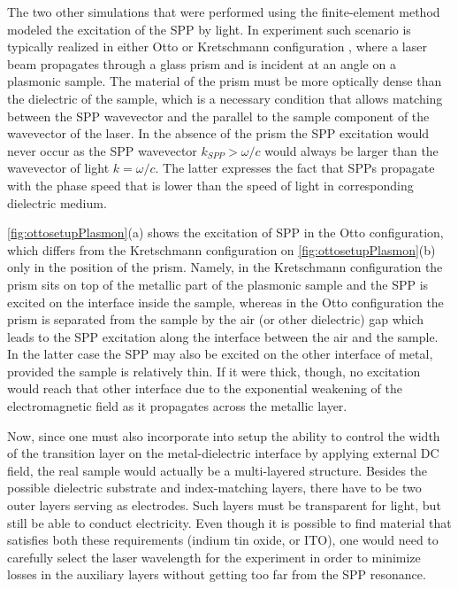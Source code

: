 The two other simulations that were performed using the finite-element method modeled the excitation of the SPP by light.
In experiment such scenario is typically realized in either Otto or Kretschmann configuration \cite{raether}, where a laser beam propagates through a glass prism and is incident at an angle on a plasmonic sample.
The material of the prism must be more optically dense than the dielectric of the sample, which is a necessary condition that allows matching between the SPP wavevector and the parallel to the sample component of the wavevector of the laser.
In the absence of the prism the SPP excitation would never occur as the SPP wavevector $k_{SPP} > \omega/c$ would always be larger than the wavevector of light $k = \omega/c$.
The latter expresses the fact that SPPs propagate with the phase speed that is lower than the speed of light in corresponding dielectric medium.

\cref{fig:ottosetupPlasmon}(a) shows the excitation of SPP in the Otto configuration, which differs from the Kretschmann configuration on \cref{fig:ottosetupPlasmon}(b) only in the position of the prism.
Namely, in the Kretschmann configuration the prism sits on top of the metallic part of the plasmonic sample and the SPP is excited on the interface inside the sample, whereas in the Otto configuration the prism is separated from the sample by the air (or other dielectric) gap which leads to the SPP excitation along the interface between the air and the sample.
In the latter case the SPP may also be excited on the other interface of metal, provided the sample is relatively thin.
If it were thick, though, no excitation would reach that other interface due to the exponential weakening of the electromagnetic field as it propagates across the metallic layer.

Now, since one must also incorporate into setup the ability to control the width of the transition layer on the metal-dielectric interface by applying external DC field, the real sample would actually be a multi-layered structure.
Besides the possible dielectric substrate and index-matching layers, there have to be two outer layers serving as electrodes.
Such layers must be transparent for light, but still be able to conduct electricity.
Even though it is possible to find material that satisfies both these requirements (indium tin oxide, or ITO), one would need to carefully select the laser wavelength for the experiment in order to minimize losses in the auxiliary layers without getting too far from the SPP resonance.

